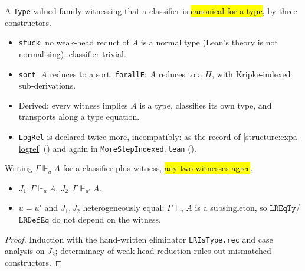 \begin{definition}
\label{inductive:expa-logrel-ind}
\leanok
{}
 A \texttt{Type}-valued family witnessing that a classifier is \hl{canonical for a
type}, by three constructors.
\begin{itemize}
\item \texttt{stuck}: no weak-head reduct of $A$ is a normal type (Lean's theory is not
normalising), classifier trivial.
\item \texttt{sort}: $A$ reduces to a sort. \texttt{forallE}: $A$ reduces to a $\Pi$, with
Kripke-indexed sub-derivations.
\item Derived: every witness implies $A$ is a type, classifies its own type, and transports along a
type equation.
\item \texttt{LogRel} is declared twice more, incompatibly: as the record of
\ref{structure:expa-logrel} () and again in
\texttt{MoreStepIndexed.lean} ().
\end{itemize}
\end{definition}

\begin{lemma}
\label{thm:expa-lristype-irrel}
\leanok
{}
 Writing $\Gamma\Vdash_u A$ for a classifier plus witness, \hl{any two witnesses
agree}.
\begin{itemize}
\item {} $J_1:\Gamma\Vdash_u A$, $J_2:\Gamma\Vdash_{u'}A$.
\item {} $u=u'$ and $J_1,J_2$ heterogeneously equal; $\Gamma\Vdash_u A$ is a subsingleton,
so $\mathtt{LREqTy}$/$\mathtt{LRDefEq}$ do not depend on the witness.
\end{itemize}
\end{lemma}
\begin{proof}
\leanok
{} Induction with the hand-written eliminator \texttt{LRIsType.rec} and case analysis on
$J_2$; determinacy of weak-head reduction rules out mismatched constructors.
\end{proof}

